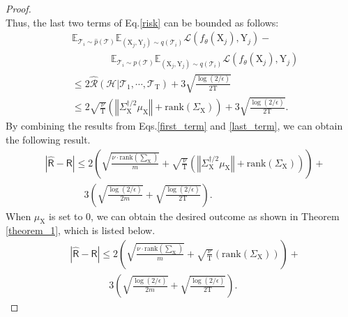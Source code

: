 \begin{proof}
\begin{equation}
\end{equation}
Thus, the last two terms of Eq.\ref{risk} can be bounded as follows:
\begin{equation}
\label{last_term}
    \begin{aligned}
            &\mathbb E_{\mathcal{T}_i\sim \hat{p}(\mathcal{T})}\mathbb E_{(\mathrm{X}_j,\mathrm{Y}_j)\sim q(\mathcal{T}_i)}\mathcal{L}(f_\theta(\mathrm{X}_j),\mathrm{Y}_j) - \\ 
            & \qquad \qquad \mathbb E_{\mathcal{T}_i\sim p(\mathcal{T})}\mathbb E_{(\mathrm{X}_j,\mathrm{Y}_j)\sim q(\mathcal{T}_i)}\mathcal{L}(f_\theta(\mathrm{X}_j),\mathrm{Y}_j) \\
            &\leq 2\hat{\mathcal{R}}(\mathcal{H}|\mathcal{T}_1,\cdots,\mathcal{T}_\mathrm{T}) + 3\sqrt{\frac{\log(2/\epsilon)}{2\mathrm{T}}} \\
            & \leq  2\sqrt{\frac{\nu}{\mathrm{T}}} \left(\left\Vert\Sigma_\mathrm{X}^{\dagger/2}\mu_\mathrm{X}\right\Vert + \text{rank}(\Sigma_\mathrm{X})\right) + 3\sqrt{\frac{\log(2/\epsilon)}{2\mathrm{T}}}.
    \end{aligned}
\end{equation}
By combining the results from Eqs.\ref{first_term} and \ref{last_term}, we can obtain the following result.
\begin{equation}
\begin{aligned}
    &|\hat{\mathsf{R}}-\mathsf{R}|\leq 2\left(\sqrt{\frac{\nu\cdot\textrm{rank}(\sum_\mathrm{X})}{m}} + \sqrt{\frac{\nu}{\mathrm{T}}}\left(\left\Vert\Sigma_\mathrm{X}^{\dagger/2}\mu_\mathrm{X}\right\Vert + \textrm{rank}(\Sigma_\mathrm{X}) \right) \right) + \\ & \qquad \qquad 3\left(\sqrt{\frac{\log(2/\epsilon)}{2m}}+\sqrt{\frac{\log(2/\epsilon)}{2\mathrm{T}}}\right).
\end{aligned}
\end{equation}
When $\mu_\mathrm{X}$ is set to 0, we can obtain the desired outcome as shown in Theorem \ref{theorem_1}, which is listed below.
\begin{equation}
\begin{aligned}
    &|\hat{\mathsf{R}}-\mathsf{R}|\leq 2\left(\sqrt{\frac{\nu\cdot\textrm{rank}(\sum_\mathrm{X})}{m}} + \sqrt{\frac{\nu}{\mathrm{T}}}\left(\textrm{rank}(\Sigma_\mathrm{X}) \right) \right) + \\ & \qquad \qquad 3\left(\sqrt{\frac{\log(2/\epsilon)}{2m}}+\sqrt{\frac{\log(2/\epsilon)}{2\mathrm{T}}}\right).
\end{aligned}
\end{equation}
\end{proof}

